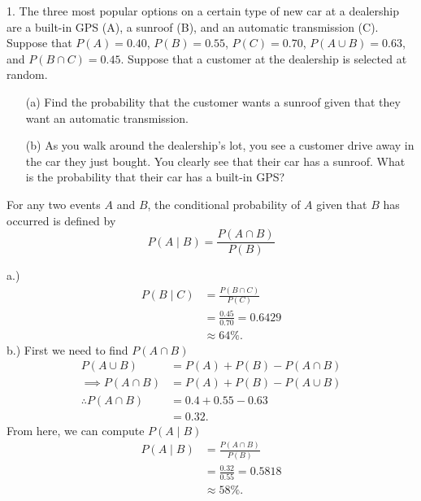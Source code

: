 \documentclass{report}
\begin{document}
    \begin{mdframed}
        1. The three most popular options on a certain type of new car at a dealership are a built-in GPS (A), a sunroof (B), and an automatic transmission (C). Suppose that \(P(A) = 0.40\), \(P(B) = 0.55\), \(P(C) = 0.70\), \(P(A \cup B) = 0.63\), and \(P(B \cap C) = 0.45\). Suppose that a customer at the dealership is selected at random.
        \begin{itemize}
            \item[(a)] Find the probability that the customer wants a sunroof given that they want an automatic transmission.
            \item[(b)] As you walk around the dealership’s lot, you see a customer drive away in the car they just bought. You clearly see that their car has a sunroof. What is the probability that their car has a built-in GPS?
        \end{itemize}
    \end{mdframed}
    \bigbreak \noindent 
    \begin{remark}
        For any two events \( A \) and \( B \), the conditional probability of \( A \)
        given that \( B \) has occurred is defined by
        \[
            P(A \mid B) = \frac{P(A \cap B)}{P(B)}
        \]
    \end{remark}
    \bigbreak \noindent 
    a.)
    \begin{align*}
        P(B \mid C) &= \frac{P(B \cap C)}{P(C)} \\
        &= \frac{0.45}{0.70} = 0.6429 \\
        &\approx 64\%
    .\end{align*}
    \bigbreak \noindent 
    b.)  First we need to find $P(A\cap B) $
    \begin{align*}
        P(A\cup B) &= P(A) + P(B) - P(A\cap B) \\
        \implies P(A\cap B) &= P(A) + P(B) - P(A\cup B) \\
        \therefore P(A\cap B) &= 0.4 + 0.55 - 0.63 \\
                              &=0.32
    .\end{align*}
    \bigbreak \noindent 
    From here, we can compute $P(A\mid B) $
    \begin{align*}
        P(A \mid B) &= \frac{P(A\cap B)}{P(B)} \\
                    &=\frac{0.32}{0.55} =0.5818 \\
                    &\approx 58\%
    .\end{align*}
\end{document}
